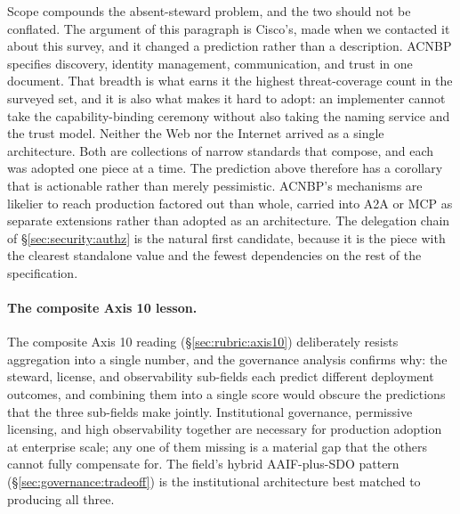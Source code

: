 Scope compounds the absent-steward problem, and the two
should not be conflated. The argument of this paragraph is
Cisco's, made when we contacted it about this survey, and
it changed a prediction rather than a description. ACNBP
specifies discovery, identity
management, communication, and trust in one document. That
breadth is what earns it the highest threat-coverage count
in the surveyed set, and it is also what makes it hard to
adopt: an implementer cannot take the capability-binding
ceremony without also taking the naming service and the
trust model. Neither the Web nor the Internet arrived as a
single architecture. Both are collections of narrow
standards that compose, and each was adopted one piece at a
time. The prediction above therefore has a corollary that
is actionable rather than merely pessimistic. ACNBP's
mechanisms are likelier to reach production factored out
than whole, carried into A2A or MCP as separate extensions
rather than adopted as an architecture. The delegation
chain of \S\ref{sec:security:authz} is the natural first
candidate, because it is the piece with the clearest
standalone value and the fewest dependencies on the rest of
the specification.

\paragraph{The composite Axis 10 lesson.}
The composite Axis 10 reading
(\S\ref{sec:rubric:axis10}) deliberately resists
aggregation into a single number, and the governance
analysis confirms why: the steward, license, and
observability sub-fields each predict different
deployment outcomes, and combining them into a
single score would obscure the predictions that the
three sub-fields make jointly. Institutional governance,
permissive licensing, and high observability together
are necessary for production adoption at enterprise
scale; any one of them missing is a material gap that
the others cannot fully compensate for. The
field's hybrid AAIF-plus-SDO pattern
(\S\ref{sec:governance:tradeoff}) is the
institutional architecture best matched to producing
all three.
